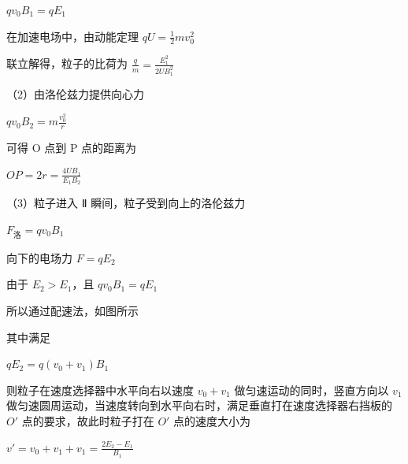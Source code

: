 \documentclass[\gkver]{gaokaozhenti}
\begin{document}
\begin{enumerate}
{$qv_{0}B_{1} = qE_{1}$

在加速电场中，由动能定理 $qU = \frac{1}{2}mv_{0}^{2}$

联立解得，粒子的比荷为 $\frac{q}{m} = \frac{E_{1}^{2}}{2UB_{1}^{2}}$

（2）由洛伦兹力提供向心力

$qv_{0}B_{2} = m\frac{v_{0}^{2}}{r}$

可得 O 点到 P 点的距离为

$OP = 2r = \frac{4UB_{1}}{E_{1}B_{2}}$

（3）粒子进入 Ⅱ 瞬间，粒子受到向上的洛伦兹力

$F_{\text{洛}} = qv_{0}B_{1}$

向下的电场力 $F = qE_{2}$

由于 $E_{2} > E_{1}$，且 $qv_{0}B_{1} = qE_{1}$

所以通过配速法，如图所示


其中满足

$qE_{2} = q(v_{0} + v_{1})B_{1}$

则粒子在速度选择器中水平向右以速度 $v_{0} + v_{1}$ 做匀速运动的同时，竖直方向以 $v_{1}$ 做匀速圆周运动，当速度转向到水平向右时，满足垂直打在速度选择器右挡板的 $O'$ 点的要求，故此时粒子打在 $O'$ 点的速度大小为

$v' = v_{0} + v_{1} + v_{1} = \frac{2E_{2} - E_{1}}{B_{1}}$
}

\end{enumerate}
\end{document}

